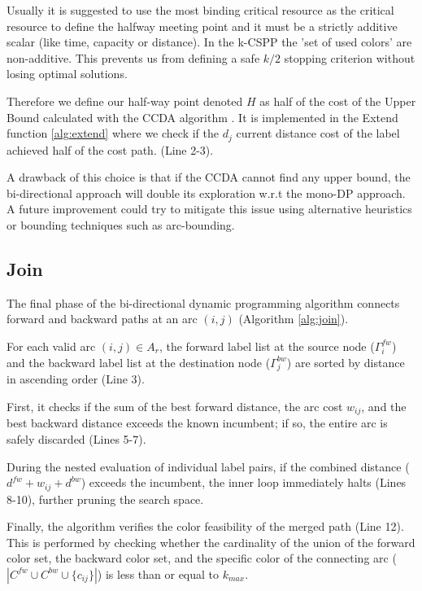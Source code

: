 \documentclass[pdflatex,sn-mathphys-num]{sn-jnl}
\begin{document}
Usually it is suggested to use the most binding critical resource as the critical resource 
to define the halfway meeting point and it must be a strictly additive scalar (like time, capacity or distance). 
In the k-CSPP the 'set of used colors' are non-additive. This prevents us from defining a safe $k/2$ stopping criterion without losing optimal solutions.

Therefore we define our half-way point denoted $H$ as half of the cost of the Upper Bound calculated with the CCDA algorithm \cite{CerroneRusso2023}.
It is implemented in the Extend function \ref{alg:extend} where we check if the $d_j$ current distance cost of the label achieved half of the cost path. (Line 2-3).

A drawback of this choice is that if the CCDA cannot find any upper bound, the bi-directional approach will double its exploration w.r.t the mono-DP approach.
A future improvement could try to mitigate this issue using alternative heuristics or bounding techniques such as arc-bounding.
\subsection{Join}
The final phase of the bi-directional dynamic programming algorithm connects forward 
and backward paths at an arc $(i, j)$ (Algorithm \ref{alg:join}).

For each valid arc $(i, j) \in A_{r}$, the forward label list at the source node ($\Gamma_i^{fw}$) 
and the backward label list at the destination node ($\Gamma_j^{bw}$) are sorted by distance in ascending order (Line 3).

First, it checks if the sum of the best forward distance, the arc cost $w_{ij}$, 
and the best backward distance exceeds the known incumbent; 
if so, the entire arc is safely discarded (Lines 5-7). 

During the nested evaluation of individual label pairs, if the combined distance ($d^{fw} + w_{ij} + d^{bw}$) 
exceeds the incumbent, the inner loop immediately halts (Lines 8-10), 
further pruning the search space.

Finally, the algorithm verifies the color feasibility of the merged path (Line 12). 
This is performed by checking whether the cardinality of the union of the forward color set, the backward color set, and the specific color of the connecting arc ($|C^{fw} \cup C^{bw} \cup \{c_{ij}\}|$) is less than or equal to $k_{max}$. 
\end{document}
